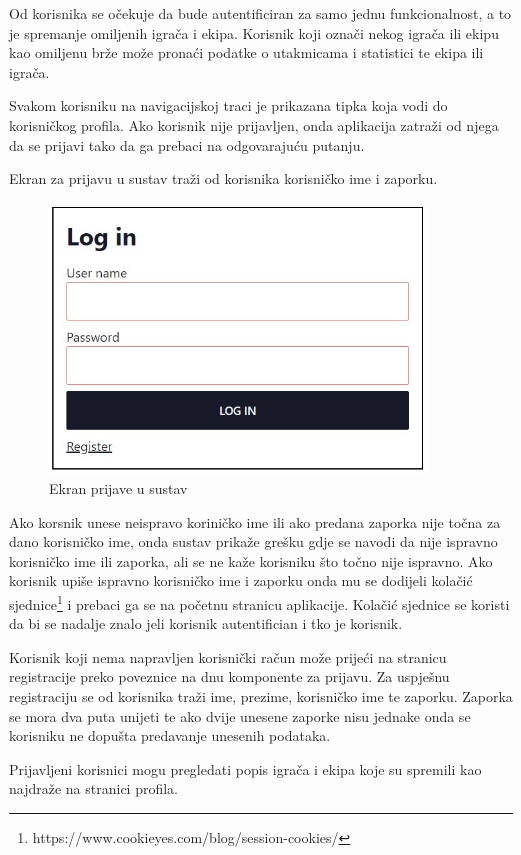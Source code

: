 \documentclass[times, utf8, zavrsni]{fer}
\begin{document}
Od korisnika se očekuje da bude autentificiran za samo jednu funkcionalnost, a to je spremanje omiljenih igrača i ekipa. Korisnik koji označi nekog igrača ili ekipu kao omiljenu brže može pronaći podatke o utakmicama i statistici te ekipa ili igrača.

Svakom korisniku na navigacijskoj traci je prikazana tipka koja vodi do korisničkog profila. Ako korisnik nije prijavljen, onda aplikacija zatraži od njega da se prijavi tako da ga prebaci na odgovarajuću putanju.

Ekran za prijavu u sustav traži od korisnika korisničko ime i zaporku.

\begin{figure}[htb]
\centering
\includegraphics[width=10cm]{images/login.jpg}
\caption{Ekran prijave u sustav}
\label{fig:login}
\end{figure}

Ako korsnik unese neispravo koriničko ime ili ako predana zaporka nije točna za dano korisničko ime, onda sustav prikaže grešku gdje se navodi da nije ispravno korisničko ime ili zaporka, ali se ne kaže korisniku što točno nije ispravno.
Ako korisnik upiše ispravno korisničko ime i zaporku onda mu se dodijeli kolačić sjednice\footnote{https://www.cookieyes.com/blog/session-cookies/} i prebaci ga se na početnu stranicu aplikacije.
Kolačić sjednice se koristi da bi se nadalje znalo jeli korisnik autentifician i tko je korisnik.

Korisnik koji nema napravljen korisnički račun može prijeći na stranicu registracije preko poveznice na dnu komponente za prijavu.
Za uspješnu registraciju se od korisnika traži ime, prezime, korisničko ime te zaporku. Zaporka se mora dva puta unijeti te ako dvije unesene zaporke nisu jednake onda se korisniku ne dopušta predavanje unesenih podataka.

Prijavljeni korisnici mogu pregledati popis igrača i ekipa koje su spremili kao najdraže na stranici profila.
\end{document}
